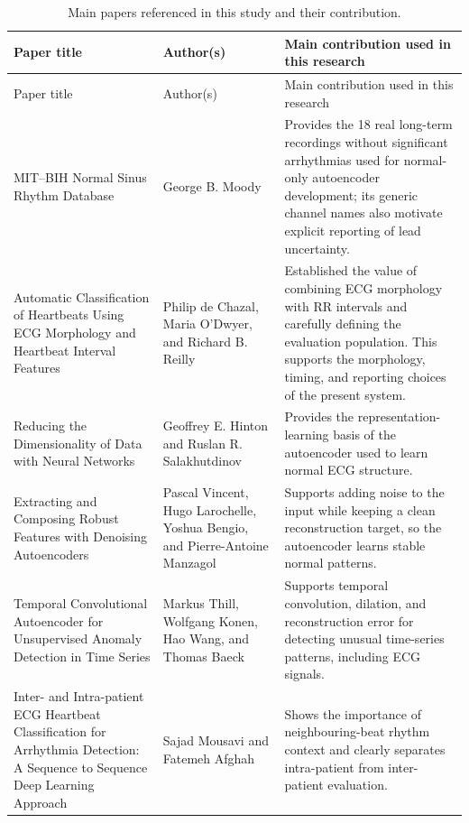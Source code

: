 \begingroup
\footnotesize
\setlength{\tabcolsep}{4pt}
\begin{longtable}{>{\raggedright\arraybackslash}p{5.0cm}>{\raggedright\arraybackslash}p{3.4cm}>{\raggedright\arraybackslash}p{5.3cm}}
\caption{Main papers referenced in this study and their contribution.}\label{tab:literature-comparison}\\
\toprule
Paper title & Author(s) & Main contribution used in this research\\
\midrule
\endfirsthead
\toprule
Paper title & Author(s) & Main contribution used in this research\\
\midrule
\endhead
MIT--BIH Normal Sinus Rhythm Database \cite{nsrdb} & George B. Moody & Provides the 18 real long-term recordings without significant arrhythmias used for normal-only autoencoder development; its generic channel names also motivate explicit reporting of lead uncertainty.\\
Automatic Classification of Heartbeats Using ECG Morphology and Heartbeat Interval Features \cite{dechazal2004heartbeat} & Philip de Chazal, Maria O'Dwyer, and Richard B. Reilly & Established the value of combining ECG morphology with RR intervals and carefully defining the evaluation population. This supports the morphology, timing, and reporting choices of the present system.\\
Reducing the Dimensionality of Data with Neural Networks \cite{hinton2006autoencoder} & Geoffrey E. Hinton and Ruslan R. Salakhutdinov & Provides the representation-learning basis of the autoencoder used to learn normal ECG structure.\\
Extracting and Composing Robust Features with Denoising Autoencoders \cite{vincent2008denoising} & Pascal Vincent, Hugo Larochelle, Yoshua Bengio, and Pierre-Antoine Manzagol & Supports adding noise to the input while keeping a clean reconstruction target, so the autoencoder learns stable normal patterns.\\
Temporal Convolutional Autoencoder for Unsupervised Anomaly Detection in Time Series \cite{thill2021tcnae} & Markus Thill, Wolfgang Konen, Hao Wang, and Thomas Baeck & Supports temporal convolution, dilation, and reconstruction error for detecting unusual time-series patterns, including ECG signals.\\
Inter- and Intra-patient ECG Heartbeat Classification for Arrhythmia Detection: A Sequence to Sequence Deep Learning Approach \cite{mousavi2019seq2seq} & Sajad Mousavi and Fatemeh Afghah & Shows the importance of neighbouring-beat rhythm context and clearly separates intra-patient from inter-patient evaluation.\\

\end{longtable}

